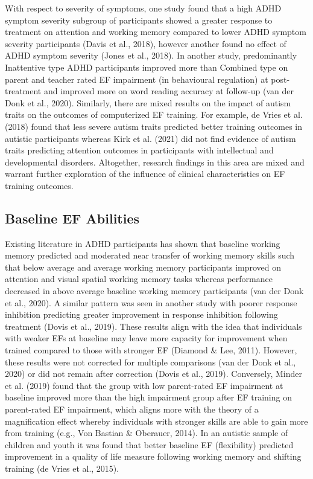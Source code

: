\documentclass[
  letterpaper,
]{ut-thesis}
\begin{document}
With respect to severity of symptoms, one study found that a high ADHD
symptom severity subgroup of participants showed a greater response to
treatment on attention and working memory compared to lower ADHD symptom
severity participants (Davis et al., 2018), however another found no
effect of ADHD symptom severity (Jones et al., 2018). In another study,
predominantly Inattentive type ADHD participants improved more than
Combined type on parent and teacher rated EF impairment (in behavioural
regulation) at post-treatment and improved more on word reading accuracy
at follow-up (van der Donk et al., 2020). Similarly, there are mixed
results on the impact of autism traits on the outcomes of computerized
EF training. For example, de Vries et al. (2018) found that less severe
autism traits predicted better training outcomes in autistic
participants whereas Kirk et al. (2021) did not find evidence of autism
traits predicting attention outcomes in participants with intellectual
and developmental disorders. Altogether, research findings in this area
are mixed and warrant further exploration of the influence of clinical
characteristics on EF training outcomes.

\subsection{Baseline EF Abilities}\label{baseline-ef-abilities}

Existing literature in ADHD participants has shown that baseline working
memory predicted and moderated near transfer of working memory skills
such that below average and average working memory participants improved
on attention and visual spatial working memory tasks whereas performance
decreased in above average baseline working memory participants (van der
Donk et al., 2020). A similar pattern was seen in another study with
poorer response inhibition predicting greater improvement in response
inhibition following treatment (Dovis et al., 2019). These results align
with the idea that individuals with weaker EFs at baseline may leave
more capacity for improvement when trained compared to those with
stronger EF (Diamond \& Lee, 2011). However, these results were not
corrected for multiple comparisons (van der Donk et al., 2020) or did
not remain after correction (Dovis et al., 2019). Conversely, Minder et
al. (2019) found that the group with low parent-rated EF impairment at
baseline improved more than the high impairment group after EF training
on parent-rated EF impairment, which aligns more with the theory of a
magnification effect whereby individuals with stronger skills are able
to gain more from training (e.g., Von Bastian \& Oberauer, 2014). In an
autistic sample of children and youth it was found that better baseline
EF (flexibility) predicted improvement in a quality of life measure
following working memory and shifting training (de Vries et al., 2015).
\end{document}

